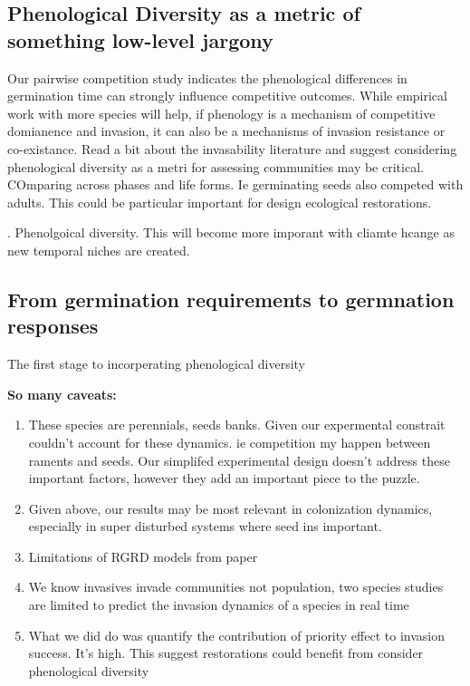 \documentclass{article}\usepackage[]{graphicx}\usepackage[]{color}
\begin{document}
 

\subsection*{Phenological Diversity as a metric of something low-level jargony}
Our pairwise competition study indicates the phenological differences in germination time can strongly influence competitive outcomes. While empirical work with more species will help, if phenology is a mechanism of competitive domianence and invasion, it can also be a mechanisms of invasion resistance or co-existance. Read a bit about the invasability literature and suggest considering phenological diversity as a metri for assessing communities may be critical. COmparing across phases and life forms. Ie germinating seeds also competed with adults. This could be particular important for design ecological restorations. 

. Phenolgoical diversity. This will become more imporant with cliamte hcange as new temporal niches are created.
\subsection*{From germination requirements to germnation responses}
The first stage to incorperating phenological diversity


\textbf{So many caveats:}
\begin{enumerate}
\item These species are perennials, seeds banks. Given our expermental constrait couldn't account for these dynamics. ie competition my happen between raments and seeds. Our simplifed experimental design doesn't address these important factors, however they add an important piece to the puzzle. 
\item Given above, our results may be most relevant in colonization dynamics, especially in super disturbed systems where seed ins important.
\item Limitations of RGRD models from paper
\item We know invasives invade communities not population, two species studies are limited to predict the invasion dynamics of a species in real time
\item What we did do was quantify the contribution of priority effect to invasion success. It's high. This suggest restorations could benefit from consider phenological diversity 
\end{enumerate}
\end{document}
